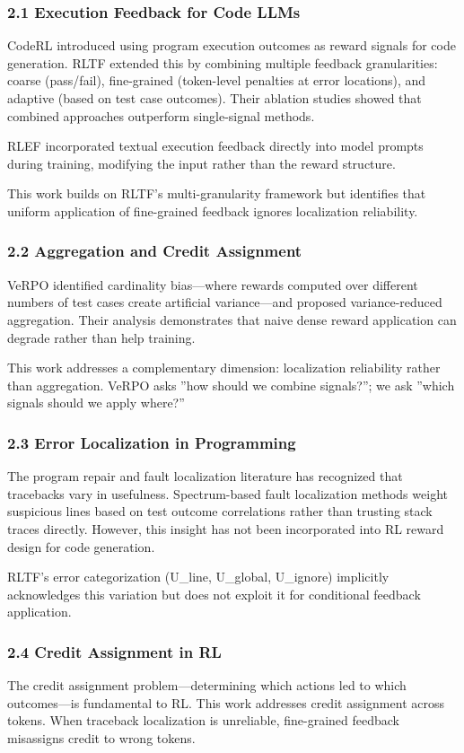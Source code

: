 
\subsubsection{2.1 Execution Feedback for Code LLMs}

CodeRL introduced using program execution outcomes as reward signals for code generation. RLTF extended this by combining multiple feedback granularities: coarse (pass/fail), fine-grained (token-level penalties at error locations), and adaptive (based on test case outcomes). Their ablation studies showed that combined approaches outperform single-signal methods.

RLEF incorporated textual execution feedback directly into model prompts during training, modifying the input rather than the reward structure.

This work builds on RLTF's multi-granularity framework but identifies that uniform application of fine-grained feedback ignores localization reliability.

\subsubsection{2.2 Aggregation and Credit Assignment}

VeRPO identified cardinality bias---where rewards computed over different numbers of test cases create artificial variance---and proposed variance-reduced aggregation. Their analysis demonstrates that naive dense reward application can degrade rather than help training.

This work addresses a complementary dimension: localization reliability rather than aggregation. VeRPO asks ''how should we combine signals?''; we ask ''which signals should we apply where?''

\subsubsection{2.3 Error Localization in Programming}

The program repair and fault localization literature has recognized that tracebacks vary in usefulness. Spectrum-based fault localization methods weight suspicious lines based on test outcome correlations rather than trusting stack traces directly. However, this insight has not been incorporated into RL reward design for code generation.

RLTF's error categorization (U\_line, U\_global, U\_ignore) implicitly acknowledges this variation but does not exploit it for conditional feedback application.

\subsubsection{2.4 Credit Assignment in RL}

The credit assignment problem---determining which actions led to which outcomes---is fundamental to RL. This work addresses credit assignment across tokens. When traceback localization is unreliable, fine-grained feedback misassigns credit to wrong tokens.

